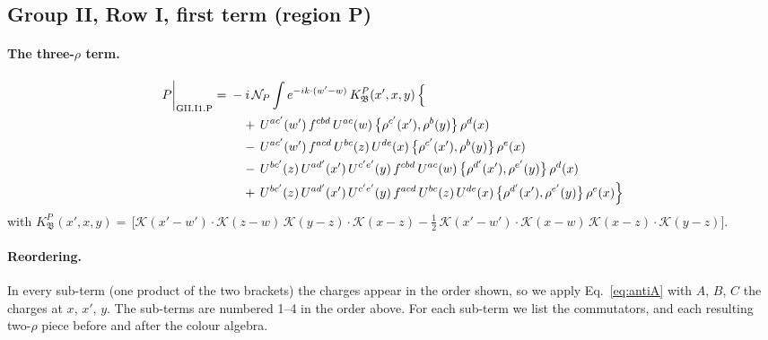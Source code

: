 \documentclass[10pt]{article}
\numberwithin{equation}{section}
\newcommand{\KK}{\mathcal K}
\newcommand{\NP}{\mathcal N_{P}}
\begin{document}
\subsection{Group II, Row I, first term (region P)}\label{sec:GII.I1.P}

\paragraph{The three-$\rho$ term.}
\begin{align}
P\bigg|_{\rm GII.I1.P}={}&-i\,\NP\int e^{-ik\cdot(w'-w)}\,K^{P}_{\mathfrak B}(x',x,y)\,\Big\{\notag\\
&\quad +\,U^{ac'}(w')\,f^{cbd}\,U^{ac}(w)\,\big\{\rho^{c'}(x'),\rho^{b}(y)\big\}\,\rho^{d}(x)\notag\\
&\quad -\,U^{ac'}(w')\,f^{acd}\,U^{bc}(z)\,U^{de}(x)\,\big\{\rho^{c'}(x'),\rho^{b}(y)\big\}\,\rho^{e}(x)\notag\\
&\quad -\,U^{bc'}(z)\,U^{ad'}(x')\,U^{c'e'}(y)\,f^{cbd}\,U^{ac}(w)\,\big\{\rho^{d'}(x'),\rho^{e'}(y)\big\}\,\rho^{d}(x)\notag\\
&\quad +\,U^{bc'}(z)\,U^{ad'}(x')\,U^{c'e'}(y)\,f^{acd}\,U^{bc}(z)\,U^{de}(x)\,\big\{\rho^{d'}(x'),\rho^{e'}(y)\big\}\,\rho^{e}(x)\Big\}\label{eq:in-GII.I1.P}
\end{align}
with $K^{P}_{\mathfrak B}(x',x,y)=\,\Big[\KK(x'-w')\cdot\KK(z-w)\,\KK(y-z)\cdot\KK(x-z)-\frac{1}{2}\,\KK(x'-w')\cdot\KK(x-w)\,\KK(x-z)\cdot\KK(y-z)\Big]$.
\paragraph{Reordering.} In every sub-term (one product of the two brackets) the charges appear in the order shown, so we apply Eq.~\eqref{eq:antiA} with $A$, $B$, $C$ the charges at $x$, $x'$, $y$. The sub-terms are numbered 1--4 in the order above. For each sub-term we list the commutators, and each resulting two-$\rho$ piece before and after the colour algebra.
\end{document}
